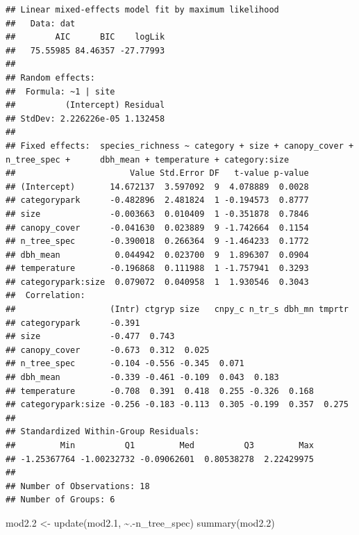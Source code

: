 \documentclass[
]{article}
\newenvironment{Shaded}{\begin{snugshade}}{\end{snugshade}}
\newcommand{\FloatTok}[1]{\textcolor[rgb]{0.00,0.00,0.81}{#1}}
\newcommand{\FunctionTok}[1]{\textcolor[rgb]{0.00,0.00,0.00}{#1}}
\newcommand{\NormalTok}[1]{#1}
\newcommand{\OtherTok}[1]{\textcolor[rgb]{0.56,0.35,0.01}{#1}}
\newcommand{\SpecialCharTok}[1]{\textcolor[rgb]{0.00,0.00,0.00}{#1}}
\begin{document}
\begin{verbatim}
## Linear mixed-effects model fit by maximum likelihood
##   Data: dat 
##        AIC      BIC    logLik
##   75.55985 84.46357 -27.77993
## 
## Random effects:
##  Formula: ~1 | site
##          (Intercept) Residual
## StdDev: 2.226226e-05 1.132458
## 
## Fixed effects:  species_richness ~ category + size + canopy_cover + n_tree_spec +      dbh_mean + temperature + category:size 
##                       Value Std.Error DF   t-value p-value
## (Intercept)       14.672137  3.597092  9  4.078889  0.0028
## categorypark      -0.482896  2.481824  1 -0.194573  0.8777
## size              -0.003663  0.010409  1 -0.351878  0.7846
## canopy_cover      -0.041630  0.023889  9 -1.742664  0.1154
## n_tree_spec       -0.390018  0.266364  9 -1.464233  0.1772
## dbh_mean           0.044942  0.023700  9  1.896307  0.0904
## temperature       -0.196868  0.111988  1 -1.757941  0.3293
## categorypark:size  0.079072  0.040958  1  1.930546  0.3043
##  Correlation: 
##                   (Intr) ctgryp size   cnpy_c n_tr_s dbh_mn tmprtr
## categorypark      -0.391                                          
## size              -0.477  0.743                                   
## canopy_cover      -0.673  0.312  0.025                            
## n_tree_spec       -0.104 -0.556 -0.345  0.071                     
## dbh_mean          -0.339 -0.461 -0.109  0.043  0.183              
## temperature       -0.708  0.391  0.418  0.255 -0.326  0.168       
## categorypark:size -0.256 -0.183 -0.113  0.305 -0.199  0.357  0.275
## 
## Standardized Within-Group Residuals:
##         Min          Q1         Med          Q3         Max 
## -1.25367764 -1.00232732 -0.09062601  0.80538278  2.22429975 
## 
## Number of Observations: 18
## Number of Groups: 6
\end{verbatim}

\begin{Shaded}
\begin{Highlighting}[]
\NormalTok{mod2}\FloatTok{.2} \OtherTok{\textless{}{-}} \FunctionTok{update}\NormalTok{(mod2}\FloatTok{.1}\NormalTok{, }\SpecialCharTok{\textasciitilde{}}\NormalTok{.}\SpecialCharTok{{-}}\NormalTok{n\_tree\_spec)}
\FunctionTok{summary}\NormalTok{(mod2}\FloatTok{.2}\NormalTok{)}
\end{Highlighting}
\end{Shaded}
\end{document}
